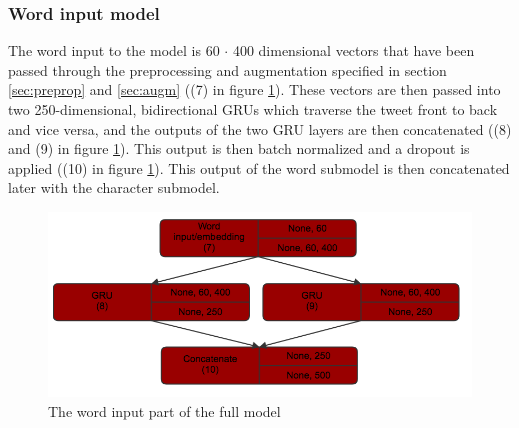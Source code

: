 \subsubsection{Word input model}
The word input to the model is 60  $\cdot$ 400 dimensional vectors that have been passed through the preprocessing and augmentation specified in section \ref{sec:preprop} and \ref{sec:augm} ((7) in figure \ref{fig:wordmodel}). These vectors are then passed into two 250-dimensional, bidirectional GRUs which traverse the tweet front to back and vice versa, and the outputs of the two GRU layers are then concatenated ((8) and (9) in figure \ref{fig:wordmodel}). This output is then batch normalized and a dropout is applied ((10) in figure \ref{fig:wordmodel}). This output of the word submodel is then concatenated later with the character submodel.\\
\begin{figure}[H] 
	\centering
		\includegraphics[scale=0.35]{pictures/word_model.png}
		\caption{The word input part of the full model}
		\label{fig:wordmodel}
\end{figure}
